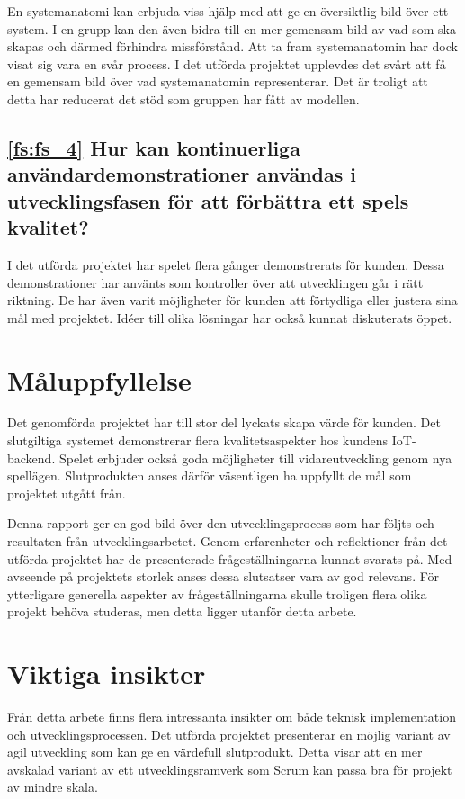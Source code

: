 En systemanatomi kan erbjuda viss hjälp med att ge en översiktlig bild över ett system. I en grupp kan den även bidra till en mer gemensam bild av vad som ska skapas och därmed förhindra missförstånd. Att ta fram systemanatomin har dock visat sig vara en svår process. I det utförda projektet upplevdes det svårt att få en gemensam bild över vad systemanatomin representerar. Det är troligt att detta har reducerat det stöd som gruppen har fått av modellen.

\subsection*{\ref{fs:fs_4} Hur kan kontinuerliga användardemonstrationer användas i utvecklingsfasen för att förbättra ett spels kvalitet?}

I det utförda projektet har spelet flera gånger demonstrerats för kunden. Dessa demonstrationer har använts som kontroller över att utvecklingen går i rätt riktning. De har även varit möjligheter för kunden att förtydliga eller justera sina mål med projektet. Idéer till olika lösningar har också kunnat diskuterats öppet.

\section{Måluppfyllelse}

Det genomförda projektet har till stor del lyckats skapa värde för kunden. Det slutgiltiga systemet demonstrerar flera kvalitetsaspekter hos kundens IoT-backend. Spelet erbjuder också goda möjligheter till vidareutveckling genom nya spellägen. Slutprodukten anses därför väsentligen ha uppfyllt de mål som projektet utgått från.

Denna rapport ger en god bild över den utvecklingsprocess som har följts och resultaten från utvecklingsarbetet. Genom erfarenheter och reflektioner från det utförda projektet har de presenterade frågeställningarna kunnat svarats på. Med avseende på projektets storlek anses dessa slutsatser vara av god relevans. För ytterligare generella aspekter av frågeställningarna skulle troligen flera olika projekt behöva studeras, men detta ligger utanför detta arbete.

\section{Viktiga insikter}

Från detta arbete finns flera intressanta insikter om både teknisk implementation och utvecklingsprocessen. Det utförda projektet presenterar en möjlig variant av agil utveckling som kan ge en värdefull slutprodukt. Detta visar att en mer avskalad variant av ett utvecklingsramverk som Scrum kan passa bra för projekt av mindre skala.

